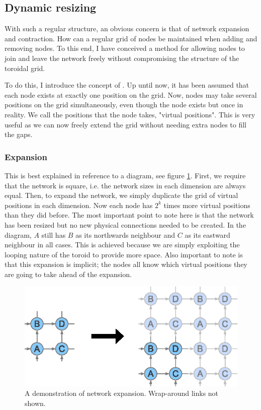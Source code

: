 \documentclass[ %
                    author={Luke Murray},
                supervisor={Dr. Simon Hollis},
                     title={Shadow Peer-to-Peer Networks},
                  subtitle={},
                    degree={MEng},
                      year={2013} ]{thesis}
\begin{document}
\subsection{Dynamic resizing}

With such a regular structure, an obvious concern is that of network expansion and contraction. How can a regular grid of nodes be maintained when adding and removing nodes. To this end, I have conceived a method for allowing nodes to join and leave the network freely without compromising the structure of the toroidal grid.

To do this, I introduce the concept of . Up until now, it has been assumed that each node exists at exactly one position on the grid. Now, nodes may take several positions on the grid simultaneously, even though the node exists but once in reality. We call the positions that the node takes, "virtual positions". This is very useful as we can now freely extend the grid without needing extra nodes to fill the gaps.

\subsubsection{Expansion}

This is best explained in reference to a diagram, see figure \ref{expand}. First, we require that the network is square, i.e. the network sizes in each dimension are always equal. Then, to expand the network, we simply duplicate the grid of virtual positions in each dimension. Now each node has $2^{k}$ times more virtual positions than they did before. The most important point to note here is that the network has been resized but no new physical connections needed to be created. In the diagram, $A$ still has $B$ as its northwards neighbour and $C$ as its eastward neighbour in all cases. This is achieved because we are simply exploiting the looping nature of the toroid to provide more space. Also important to note is that this expansion is implicit; the nodes all know which virtual positions they are going to take ahead of the expansion.

\begin{figure}[h]
\centering
\includegraphics{diagrams/network_expand.eps}
\caption{A demonstration of network expansion. Wrap-around links not shown.}
\label{expand}
\end{figure}
\end{document}
